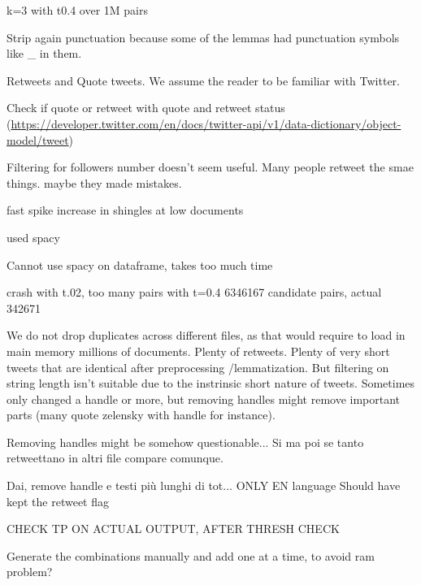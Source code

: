 \documentclass[runningheads]{llncs}
\begin{document}
k=3 with t0.4 over 1M pairs

Strip again punctuation because some of the lemmas had punctuation symbols like \_ in them.

Retweets and Quote tweets. We assume the reader to be familiar with Twitter.

Check if quote or retweet with quote and retweet status (\url{https://developer.twitter.com/en/docs/twitter-api/v1/data-dictionary/object-model/tweet})

Filtering for followers number doesn't seem useful. Many people retweet the smae things. maybe they made mistakes.

fast spike increase in shingles at low documents

used spacy 

Cannot use spacy on dataframe, takes too much time

crash with t.02, too many pairs
with t=0.4 6346167 candidate pairs, actual 342671 

We do not drop duplicates across different files, as that would require to load in main memory millions of documents. Plenty of retweets. Plenty of very short tweets that are identical after preprocessing /lemmatization. But filtering on string length isn't suitable due to the instrinsic short nature of tweets.  
Sometimes only changed a handle or more, but removing handles might remove important parts (many quote zelensky with handle for instance).

Removing handles might be somehow questionable... Si ma poi se tanto retweettano in altri file compare comunque.

Dai, remove handle e testi più lunghi di tot...
ONLY EN language
Should have kept the retweet flag


CHECK TP ON ACTUAL OUTPUT, AFTER THRESH CHECK

Generate the combinations manually and add one at a time, to avoid ram problem?



\end{document}
